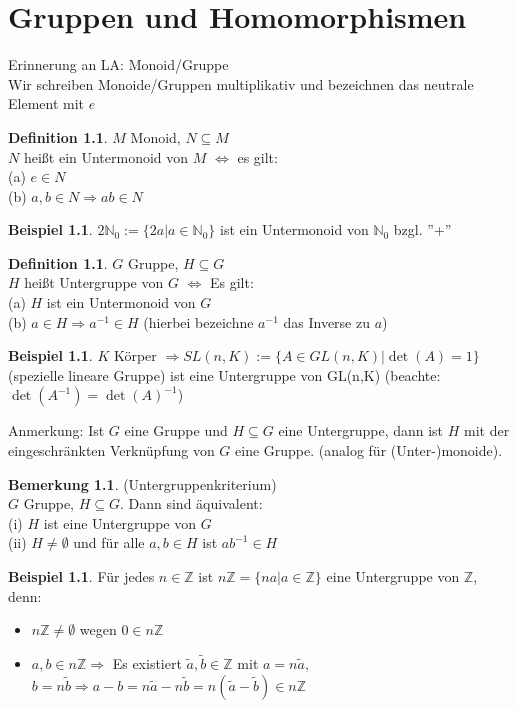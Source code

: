 \documentclass[10pt,a4paper,numbers=endperiod]{scrreprt}
\theoremstyle{definition}
\newtheorem{defi}[satz]{Definition}
\newtheorem{bem}[satz]{Bemerkung}
\newtheorem{bsp}[satz]{Beispiel}
\def\NN{{\mathbb N}}
\def\ZZ{{\mathbb Z}}
\begin{document}
\chapter{Gruppen und Homomorphismen}
\onehalfspacing

Erinnerung an LA: Monoid/Gruppe\\ 
Wir schreiben Monoide/Gruppen multiplikativ und bezeichnen das neutrale Element mit $e$

\begin{defi}
	$M$ Monoid, $N \subseteq M$\\
	$N$ heißt ein Untermonoid von $M$ $\Leftrightarrow$ es gilt:\\
	(a) $e \in N$\\
	(b) $a,b \in N \Rightarrow ab \in N$
\end{defi}

\begin{bsp}
	$2 \NN_0 := \{2a | a \in \NN_0\}$ ist ein Untermonoid von $\NN_0$ bzgl. ''+''
\end{bsp}

\begin{defi}
	$G$ Gruppe, $H \subseteq G$\\
	$H$ heißt Untergruppe von $G$ $\Leftrightarrow$ Es gilt:\\
	(a) $H$ ist ein Untermonoid von $G$\\
	(b) $a \in H \Rightarrow a^{-1} \in H$ (hierbei bezeichne $a^{-1}$ das Inverse zu $a$)
\end{defi}

\begin{bsp}
	$K$ Körper $\Rightarrow SL(n,K) := \{A \in GL(n,K) | \det(A) = 1\}$ (spezielle lineare Gruppe) ist eine Untergruppe von GL(n,K) (beachte: $\det(A^{-1}) = \det(A)^{-1}$) 
\end{bsp}

Anmerkung: Ist $G$ eine Gruppe und $H \subseteq G$ eine Untergruppe, dann ist $H$ mit der eingeschränkten Verknüpfung von $G$ eine Gruppe. (analog für (Unter-)monoide).

\begin{bem}
	(Untergruppenkriterium)\\
	$G$ Gruppe, $H \subseteq G$. Dann sind äquivalent:\\
	(i) $H$ ist eine Untergruppe von $G$\\
	(ii) $H \neq \emptyset$ und für alle $a,b \in H$ ist $ab^{-1} \in H$ 
\end{bem}

\begin{bsp}
	Für jedes $n \in \ZZ$ ist $n\ZZ = \{na| a \in \ZZ \}$ eine Untergruppe von $\ZZ$, denn:
	\begin{itemize}
		\item $n \ZZ \neq \emptyset$ wegen $0 \in n\ZZ$
		\item $a, b \in n \ZZ \Rightarrow$ Es existiert $\tilde{a}, \tilde{b} \in \ZZ$ mit $a = n\tilde{a}$, $b = n\tilde{b} \Rightarrow a-b = n\tilde{a} - n\tilde{b} = n(\tilde{a} - \tilde{b}) \in n\ZZ$
	\end{itemize}
\end{bsp}
\end{document}

